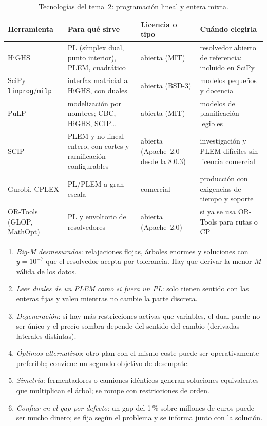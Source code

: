 \begin{table}[h]
\centering\small
\caption{Tecnologías del tema~2: programación lineal y entera mixta.}\label{tab:tec2}
\begin{tabularx}{\textwidth}{@{}l>{\raggedright\arraybackslash}X>{\raggedright\arraybackslash}p{2.3cm}>{\raggedright\arraybackslash}X@{}}
\toprule
Herramienta & Para qué sirve & Licencia o tipo & Cuándo elegirla \\
\midrule
HiGHS~\cite{highs} & PL (símplex dual, punto interior), PLEM, cuadrático & abierta (MIT) & resolvedor abierto de referencia; incluido en SciPy \\
SciPy \texttt{linprog}/\texttt{milp} & interfaz matricial a HiGHS, con duales & abierta (BSD-3) & modelos pequeños y docencia \\
PuLP~\cite{pulp} & modelización por nombres; CBC, HiGHS, SCIP\dots & abierta (MIT) & modelos de planificación legibles \\
SCIP & PLEM y no lineal entero, con cortes y ramificación configurables & abierta (Apache~2.0 desde la 8.0.3) & investigación y PLEM difíciles sin licencia comercial \\
Gurobi, CPLEX & PL/PLEM a gran escala & comercial & producción con exigencias de tiempo y soporte \\
OR-Tools (GLOP, MathOpt) & PL y envoltorio de resolvedores & abierta (Apache~2.0) & si ya se usa OR-Tools para rutas o CP \\
\bottomrule
\end{tabularx}
\end{table}

\begin{observacion}\label{obs:errores2}
\begin{enumerate}[label=(\alph*)]
  \item \emph{Big-M desmesuradas}: relajaciones flojas, árboles enormes y soluciones con $y=10^{-7}$ que el resolvedor acepta por tolerancia. Hay que derivar la menor $M$ válida de los datos.
  \item \emph{Leer duales de un PLEM como si fuera un PL}: solo tienen sentido con las enteras fijas y valen mientras no cambie la parte discreta.
  \item \emph{Degeneración}: si hay más restricciones activas que variables, el dual puede no ser único y el precio sombra depende del sentido del cambio (derivadas laterales distintas).
  \item \emph{Óptimos alternativos}: otro plan con el mismo coste puede ser operativamente preferible; conviene un segundo objetivo de desempate.
  \item \emph{Simetría}: fermentadores o camiones idénticos generan soluciones equivalentes que multiplican el árbol; se rompe con restricciones de orden.
  \item \emph{Confiar en el gap por defecto}: un gap del 1\,\% sobre millones de euros puede ser mucho dinero; se fija según el problema y se informa junto con la solución.
\end{enumerate}
\end{observacion}

